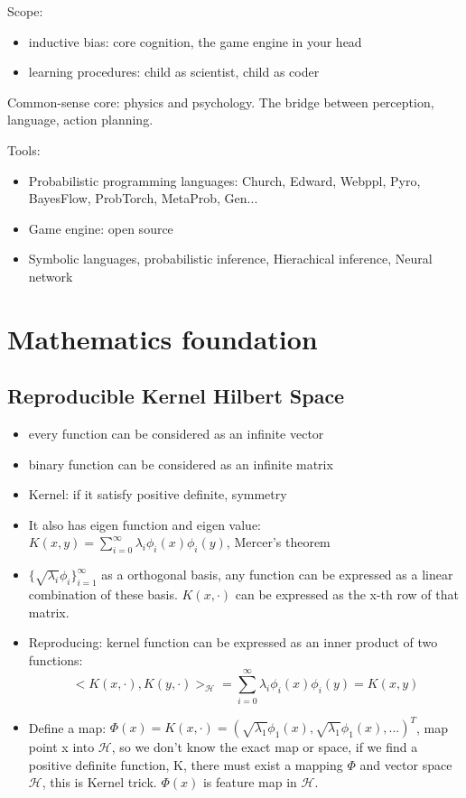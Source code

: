\documentclass[12pt, letterpaper]{article}
\begin{document}
Scope:
\begin{itemize}
	\item inductive bias: core cognition, the game engine in your head
	\item learning procedures: child as scientist, child as coder
\end{itemize}

Common-sense core: physics and psychology.
The bridge between perception, language, action planning.

Tools:
\begin{itemize}
	\item Probabilistic programming languages: Church, Edward, Webppl, Pyro, BayesFlow, ProbTorch, MetaProb, Gen...
	\item Game engine: open source
	\item Symbolic languages, probabilistic inference, Hierachical inference, Neural network
\end{itemize}

\newpage

\section{Mathematics foundation}

\subsection{Reproducible Kernel Hilbert Space}

\begin{itemize}
	\item every function can be considered as an infinite vector
	\item binary function can be considered as an infinite matrix
	\item Kernel: if it satisfy positive definite, symmetry
	\item It also has eigen function and eigen value: $K(x,y) = \sum_{i=0}^{\infty} \lambda_i \phi_{i}(x) \phi_{i}(y)$, Mercer's theorem
	\item $ \{ \sqrt{\lambda_i} \phi_i \}_{i=1}^{\infty}$ as a orthogonal basis, any function can be expressed as a linear combination of these basis. $K(x, \cdot)$ can be expressed as the x-th row of that matrix.
	\item Reproducing: kernel function can be expressed as an inner product of two functions:
\begin{equation}
< K(x, \cdot), K(y,\cdot) >_{\mathcal{H}} = \sum_{i=0}^{\infty} \lambda_i \phi_i (x) \phi_i(y) = K(x,y)
\end{equation}
	\item Define a map: $\Phi(x) = K(x,\cdot) = (\sqrt{\lambda_1} \phi_1 (x), \sqrt{\lambda_1} \phi_1 (x), ...)^{T}$, map point x into $\mathcal{H}$, so we don't know the exact map or space, if we find a positive definite function, K, there must exist a mapping $\Phi$ and vector space $\mathcal{H}$, this is Kernel trick. $\Phi(x)$ is feature map in $\mathcal{H}$.
\end{itemize}
\end{document}
